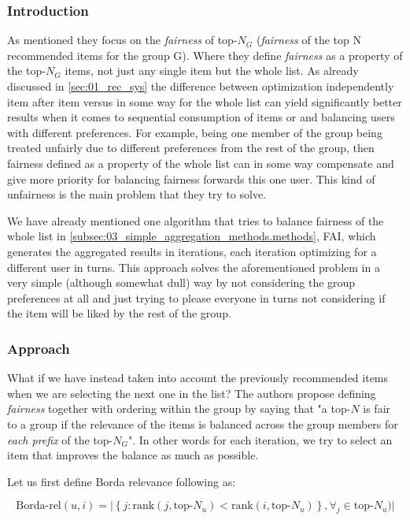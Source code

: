\subsubsection{Introduction}

As mentioned they focus on the \textit{fairness} of top-$N_G$ (\textit{fairness} of the top N recommended items for the group G). Where they define \textit{fairness} as a property of the top-$N_G$ items, not just any single item but the whole list. As already discussed in \ref{sec:01_rec_sys} the difference between optimization independently item after item versus in some way for the whole list can yield significantly better results when it comes to sequential consumption of items or and balancing users with different preferences. For example, being one member of the group being treated unfairly due to different preferences from the rest of the group, then fairness defined as a property of the whole list can in some way compensate and give more priority for balancing fairness forwards this one user. This kind of unfairness is the main problem that they try to solve.

We have already mentioned one algorithm that tries to balance fairness of the whole list in \ref{subsec:03_simple_aggregation_methods.methods}, FAI, which generates the aggregated results in iterations, each iteration optimizing for a different user in turns. This approach solves the aforementioned problem in a very simple (although somewhat dull) way by not considering the group preferences at all and just trying to please everyone in turns not considering if the item will be liked by the rest of the group.


\subsubsection{Approach}

What if we have instead taken into account the previously recommended items when we are selecting the next one in the list? The authors propose defining \textit{fairness} together with ordering within the group by saying that "a top-$N$ is fair to a group if the relevance of the items is balanced across the group members for \textit{each prefix} of the top-$N_G$". In other words for each iteration, we try to select an item that improves the balance as much as possible.

Let us first define Borda relevance following \cite{xiao_2017_fairness_aware_g_rec} as:


\begin{equation}
    \textrm{Borda-rel}(u,i) = 
    \big\lvert{
        \left\{j : \textrm{rank}(j, \textrm{top-}N_u) < \textrm{rank}(i, \textrm{top-}N_u) \right\}, \forall_j \in \textrm{top-}N_u)
    }\big\rvert
\end{equation}

